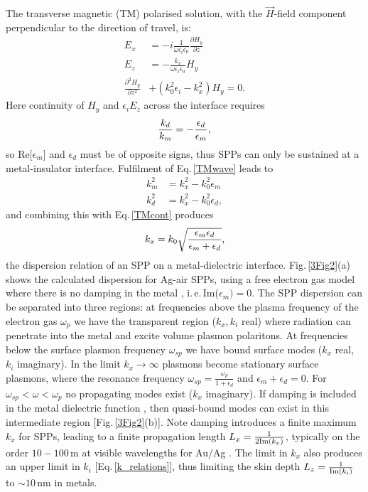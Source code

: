 The transverse magnetic (TM) polarised solution, with the $\vec{H}$-field component perpendicular to the direction of travel, is:
\begin{subequations}
\label{TMplasmons}
\begin{align}
E_x &= -i \frac{1}{\omega \epsilon_i \epsilon_0} \frac{\partial H_y}{\partial z}\\
E_z &= -\frac{k_x}{\omega \epsilon_i \epsilon_0} H_y\\
\frac{\partial^2 H_y}{\partial z^2} &+ (k_0^2 \epsilon_i-k_x^2)H_y = 0 \label{TMwave}.
\end{align}
\end{subequations}
Here continuity of $H_y$ and $\epsilon_i E_z$ across the interface requires
\begin{equation}
\centering
\frac{k_d}{k_m} = -\frac{\epsilon_d}{\epsilon_m} ,
\label{TMcont}
\end{equation}
so Re[$\epsilon_m$] and $\epsilon_d$ must be of opposite signs, thus SPPs can only be sustained at a metal-insulator interface. Fulfilment of Eq.\,\ref{TMwave} leads to 
\begin{subequations}
\label{k_relations}
\begin{align}
k_m^2 &= k_x^2-k_0^2\epsilon_m\\
k_d^2 &= k_x^2-k_0^2\epsilon_d ,
\end{align}
\end{subequations}
and combining this with Eq.\,\ref{TMcont} produces
\begin{equation}
\centering
k_x = k_0\sqrt{\frac{\epsilon_m \epsilon_d}{\epsilon_m + \epsilon_d}} ,
\label{SPPdispersion}
\end{equation}
the dispersion relation of an SPP on a metal-dielectric interface. Fig.\,\ref{3Fig2}(a) shows the calculated dispersion for Ag-air SPPs, using a free electron gas model where there is no damping in the metal \cite{Zeman1987}, i.\,e.\,Im($\epsilon_m)=0$. The SPP dispersion can be separated into three regions: at frequencies above the plasma frequency of the electron gas $\omega_p$ we have the transparent region ($k_x, k_i$ real) where radiation can penetrate into the metal and excite volume plasmon polaritons. At frequencies below the surface plasmon frequency $\omega_{sp}$ we have bound surface modes ($k_x$ real, $k_i$ imaginary). In the limit $k_x\rightarrow \infty$ plasmons become stationary surface plasmons, where the resonance frequency $\omega_{sp} = \frac{\omega_p}{1+\epsilon_d}$ and $\epsilon_m+\epsilon_d=0$. For $\omega_{sp}<\omega<\omega_p$ no propagating modes exist ($k_x$ imaginary). If damping is included in the metal dielectric function \cite{Johnson1972}, then quasi-bound modes can exist in this intermediate region [Fig.\,\ref{3Fig2}(b)]. Note damping introduces a finite maximum $k_x$ for SPPs, leading to a finite propagation length $L_x = \frac{1}{2\textnormal{Im}(k_x)}$, typically on the order $10-100\,$\textmu m at visible wavelengths for Au/Ag \cite{Maier2007}. The limit in $k_x$ also produces an upper limit in $k_i$ [Eq.\,\ref{k_relations}], thus limiting the skin depth $L_z = \frac{1}{\textnormal{Im}(k_i)}$ to $\sim10$\,nm in metals. 

